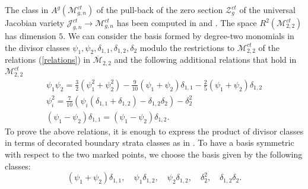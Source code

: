 \documentclass[10pt]{amsart}
\theoremstyle{definition}
\begin{document}
The class in $A^g({\mathcal{M}}_{g,n}^{ct})$ of the pull-back of the zero section ${\mathcal{Z}}^{ct}_g$ of the universal Jacobian variety $\mathcal{J}^{ct}_{g,n}\rightarrow{\mathcal{M}}_{g,n}^{ct}$ has been computed in \cite{Hain} and \cite{GZ1}. The space $R^2(\mathcal{M}^{ct}_{2,2})$ has dimension $5$. We can consider the basis formed by degree-two monomials in the divisor classes $\psi_1, \psi_2, \delta_{1,1}, \delta_{1,2}, \delta_2$ modulo the restrictions to ${\mathcal{M}}_{2,2}^{ct}$ of the relations (\ref{relations}) in ${\overline{\mathcal{M}}}_{2,2}$ and the following additional relations that hold in ${\mathcal{M}}_{2,2}^{ct}$
\begin{eqnarray}
\label{relations2}
 \psi_1\psi_2 = \frac{3}{2}\left(\psi_1^2 + \psi_2^2\right) -\frac{9}{10} \left(\psi_1 + \psi_2 \right)\delta_{1,1} -\frac{2}{5} \left(\psi_1 + \psi_2\right)\delta_{1,2} \nonumber\\
 \psi_i^2 = \frac{7}{10} \left(\psi_i \left(\delta_{1,1}+\delta_{1,2} \right) - \delta_{1,2}\delta_2\right) -\delta_2^2\\
 \left(\psi_1-\psi_2\right) \delta_{1,1} = \left(\psi_1-\psi_2\right) \delta_{1,2}.\nonumber
\end{eqnarray}
To prove the above relations, it is enough to express the product of divisor classes in terms of decorated boundary strata classes as in \cite{MR1672112}.
To have a basis symmetric with respect to the two marked points, we choose the basis given by the following classes:
\[
 \left(\psi_1+\psi_2\right)\delta_{1,1},\quad \psi_1\delta_{1,2},\quad \psi_2\delta_{1,2},\quad \delta_2^2,\quad \delta_{1,2}\delta_2.
\]
\end{document}
